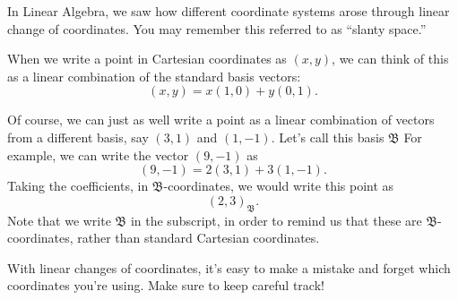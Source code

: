 \documentclass{ximera}
\begin{document}
In Linear Algebra, we saw how different coordinate systems arose through linear change of coordinates. You may remember this referred to as ``slanty space.''

When we write a point in Cartesian coordinates as $(x,y)$, we can think of this as a linear combination of the standard basis vectors:
\[
(x,y) = x(1,0) + y(0,1).
\]

Of course, we can just as well write a point as a linear combination of vectors from a different basis, say $(3,1)$ and $(1, -1)$. Let's call this basis $\mathfrak{B}$ For example, we can write the vector $(9,-1)$ as
\[
(9,-1) = 2(3,1)+3(1,-1).
\]
Taking the coefficients, in $\mathfrak{B}$-coordinates, we would write this point as
\[
(2,3)_{\mathfrak{B}}.
\]
Note that we write $\mathfrak{B}$ in the subscript, in order to remind us that these are $\mathfrak{B}$-coordinates, rather than standard Cartesian coordinates.

\begin{image}
\end{image}

With linear changes of coordinates, it's easy to make a mistake and forget which coordinates you're using. Make sure to keep careful track!
\end{document}
